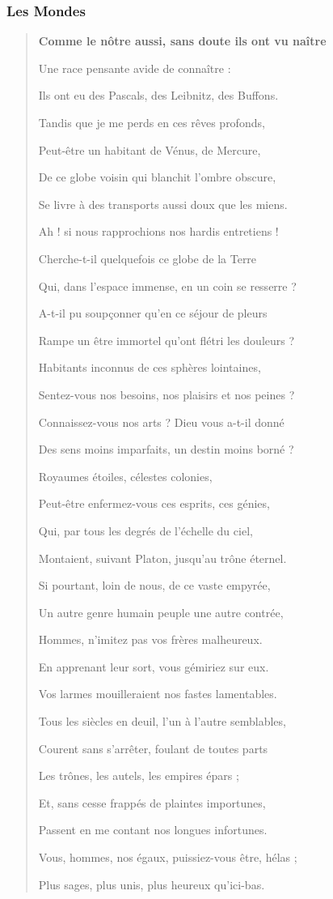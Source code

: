 \documentclass[a4paper, 11pt, oneside, landscape]{article}
\begin{document}
\subsubsection{Les Mondes}
\begin{quotation}\bfseries\small
Comme le nôtre aussi, sans doute ils ont vu naître

Une race pensante avide de connaître :

Ils ont eu des Pascals, des Leibnitz, des Buffons.

Tandis que je me perds en ces rêves profonds,

Peut-être un habitant de Vénus, de Mercure,

De ce globe voisin qui blanchit l'ombre obscure,

Se livre à des transports aussi doux que les miens.

Ah ! si nous rapprochions nos hardis entretiens !

Cherche-t-il quelquefois ce globe de la Terre

Qui, dans l'espace immense, en un coin se resserre ?

A-t-il pu soupçonner qu'en ce séjour de pleurs

Rampe un être immortel qu'ont flétri les douleurs ?

Habitants inconnus de ces sphères lointaines,

Sentez-vous nos besoins, nos plaisirs et nos peines ?

Connaissez-vous nos arts ? Dieu vous a-t-il donné

Des sens moins imparfaits, un destin moins borné ?

Royaumes étoiles, célestes colonies,

Peut-être enfermez-vous ces esprits, ces génies,

Qui, par tous les degrés de l'échelle du ciel,

Montaient, suivant Platon, jusqu'au trône éternel.

Si pourtant, loin de nous, de ce vaste empyrée,

Un autre genre humain peuple une autre contrée,

Hommes, n'imitez pas vos frères malheureux.

En apprenant leur sort, vous gémiriez sur eux.

Vos larmes mouilleraient nos fastes lamentables.

Tous les siècles en deuil, l'un à l'autre semblables,

Courent sans s'arrêter, foulant de toutes parts

Les trônes, les autels, les empires épars ;

Et, sans cesse frappés de plaintes importunes,

Passent en me contant nos longues infortunes.

Vous, hommes, nos égaux, puissiez-vous être, hélas ;

Plus sages, plus unis, plus heureux qu'ici-bas.
\end{quotation}
\clearpage
\end{document}

